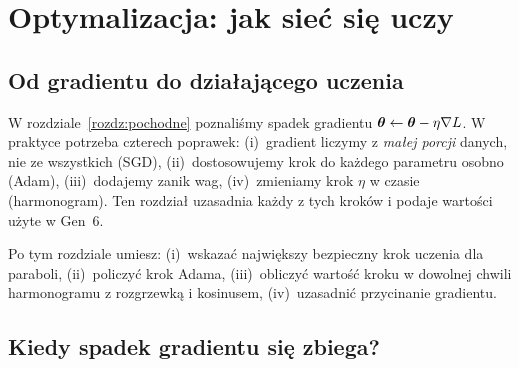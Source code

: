 \chapter{Optymalizacja: jak sieć się uczy}\label{rozdz:optymalizacja}

\section{Od gradientu do działającego uczenia}

W rozdziale~\ref{rozdz:pochodne} poznaliśmy spadek gradientu $\bm{\theta}\leftarrow\bm{\theta}-\eta\nabla L$. W praktyce potrzeba czterech poprawek: (i)~gradient liczymy z \emph{małej porcji} danych, nie ze wszystkich (SGD), (ii)~dostosowujemy krok do każdego parametru osobno (Adam),
(iii)~dodajemy zanik wag, (iv)~zmieniamy krok $\eta$ w czasie (harmonogram). Ten rozdział uzasadnia każdy z tych kroków i podaje wartości użyte w Gen~6.

Po tym rozdziale umiesz: (i)~wskazać największy bezpieczny krok uczenia dla paraboli, (ii)~policzyć krok Adama, (iii)~obliczyć wartość kroku w dowolnej chwili harmonogramu z rozgrzewką i kosinusem, (iv)~uzasadnić przycinanie gradientu.

\section{Kiedy spadek gradientu się zbiega?}

